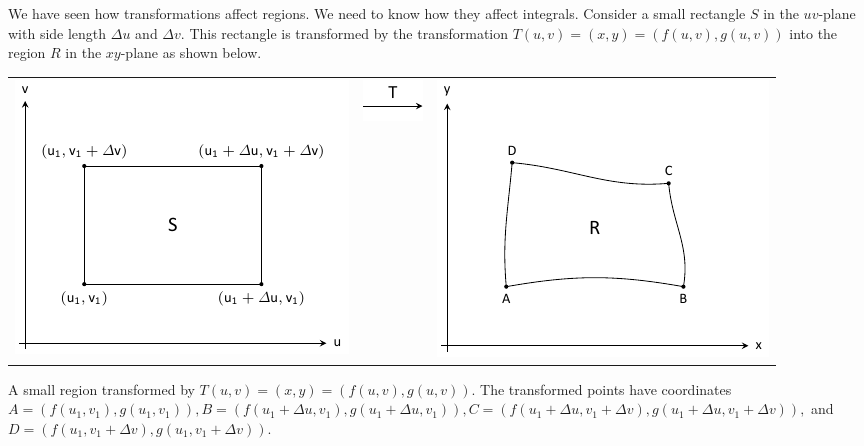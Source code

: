 We have seen how transformations affect regions.  We need to know how they affect integrals.  Consider a small rectangle $S$ in the $uv$-plane with side length $\Delta u$ and $\Delta v.$  This rectangle is transformed by the transformation $T(u,v) = (x,y) = (f(u,v),g(u,v))$ into the region $R$ in the $xy$-plane as shown below.

\addtocounter{figure}{1}
\vskip 10pt
\hskip-50pt
\noindent\begin{minipage}[t]{\textwidth+100pt}
	\begin{tabular}{ccc}
		\includegraphics[align=c]{figures/fig13_jacobian_area_transformation_a} & \includegraphics[align=c]{figures/fig13_jacobian_area_transformation_b} & \includegraphics[align=c]{figures/fig13_jacobian_area_transformation_c}
	\end{tabular}
	\captionsetup{type=figure}%
	\caption{A small region transformed by $T(u,v) = (x,y) = (f(u,v),g(u,v))$.  The transformed points have coordinates $A = (f(u_1,v_1),g(u_1,v_1)), B = (f(u_1+\Delta u, v_1), g(u_1+\Delta u, v_1)), C = (f(u_1+ \Delta u,v_1 + \Delta v), g(u_1 + \Delta u, v_1 + \Delta v)),$ and $D = (f(u_1,v_1 + \Delta v),g(u_1, v_1 + \Delta v)).$}
	\label{fig:area_transformation}
\end{minipage}
\\
\vskip10pt
\addtocounter{figure}{-2}

